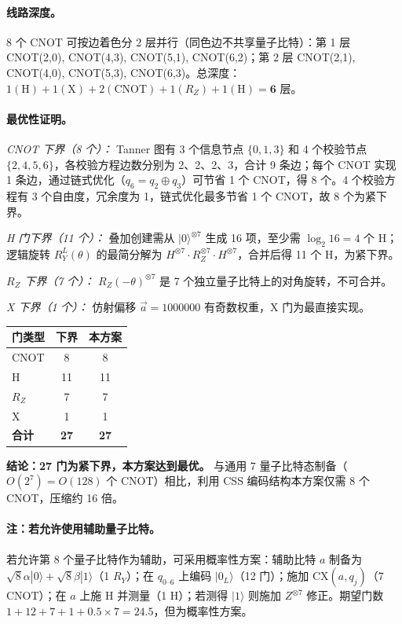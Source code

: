 \documentclass{ctexart}
\begin{document}
\paragraph{线路深度。}
8 个 CNOT 可按边着色分 2 层并行（同色边不共享量子比特）：第 1 层 CNOT(2,0), CNOT(4,3), CNOT(5,1), CNOT(6,2)；第 2 层 CNOT(2,1), CNOT(4,0), CNOT(5,3), CNOT(6,3)。总深度：$1(\text{H}) + 1(\text{X}) + 2(\text{CNOT}) + 1(R_Z) + 1(\text{H}) = \textbf{6 层}$。

\paragraph{最优性证明。}
\emph{CNOT 下界（8 个）：} Tanner 图有 3 个信息节点 $\{0,1,3\}$ 和 4 个校验节点 $\{2,4,5,6\}$，各校验方程边数分别为 2、2、2、3，合计 9 条边；每个 CNOT 实现 1 条边，通过链式优化（$q_6 = q_2 \oplus q_3$）可节省 1 个 CNOT，得 8 个。4 个校验方程有 3 个自由度，冗余度为 1，链式优化最多节省 1 个 CNOT，故 8 个为紧下界。

\emph{H 门下界（11 个）：} 叠加创建需从 $|0\rangle^{\otimes7}$ 生成 16 项，至少需 $\log_2 16 = 4$ 个 H；逻辑旋转 $R_Y^L(\theta)$ 的最简分解为 $H^{\otimes 7}\cdot R_Z^{\otimes 7}\cdot H^{\otimes 7}$，合并后得 11 个 H，为紧下界。

\emph{$R_Z$ 下界（7 个）：} $R_Z(-\theta)^{\otimes 7}$ 是 7 个独立量子比特上的对角旋转，不可合并。

\emph{X 下界（1 个）：} 仿射偏移 $\vec{a}=1000000$ 有奇数权重，X 门为最直接实现。

\begin{table}[H]
\centering
\begin{tabular}{lcc}
\toprule
\textbf{门类型} & \textbf{下界} & \textbf{本方案} \\
\midrule
CNOT & 8 & 8 \\
H     & 11 & 11 \\
$R_Z$ & 7 & 7 \\
X     & 1 & 1 \\
\midrule
\textbf{合计} & \textbf{27} & \textbf{27} \\
\bottomrule
\end{tabular}
\end{table}
\textbf{结论：27 门为紧下界，本方案达到最优。} 与通用 7 量子比特态制备（$O(2^7)=O(128)$ 个 CNOT）相比，利用 CSS 编码结构本方案仅需 8 个 CNOT，压缩约 16 倍。

\paragraph{注：若允许使用辅助量子比特。}
若允许第 8 个量子比特作为辅助，可采用概率性方案：辅助比特 $a$ 制备为 $\sqrt{8}\alpha|0\rangle + \sqrt{8}\beta|1\rangle$（1 $R_Y$）；在 $q_{0\text{--}6}$ 上编码 $|0_L\rangle$（12 门）；施加 CX$(a,q_j)$（7 CNOT）；在 $a$ 上施 H 并测量（1 H）；若测得 $|1\rangle$ 则施加 $Z^{\otimes7}$ 修正。期望门数 $1+12+7+1+0.5\times7=24.5$，但为概率性方案。
\end{document}
